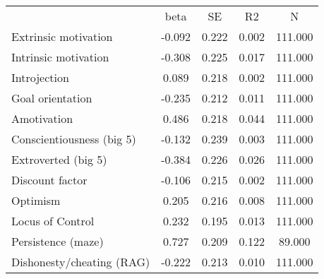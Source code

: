 {\def\sym#1{\ifmmode^{#1}\else\(^{#1}\)\fi} \begin{tabular}{l*{4}{c}} \hline\hline 
& beta & SE & R2 & N \\
Extrinsic motivation & -0.092 & 0.222 & 0.002 & 111.000 \\
Intrinsic motivation & -0.308 & 0.225 & 0.017 & 111.000 \\
Introjection & 0.089 & 0.218 & 0.002 & 111.000 \\
Goal orientation & -0.235 & 0.212 & 0.011 & 111.000 \\
Amotivation & 0.486 & 0.218 & 0.044 & 111.000 \\
Conscientiousness (big 5) & -0.132 & 0.239 & 0.003 & 111.000 \\
Extroverted (big 5) & -0.384 & 0.226 & 0.026 & 111.000 \\
Discount factor & -0.106 & 0.215 & 0.002 & 111.000 \\
Optimism & 0.205 & 0.216 & 0.008 & 111.000 \\
Locus of Control & 0.232 & 0.195 & 0.013 & 111.000 \\
Persistence (maze) & 0.727 & 0.209 & 0.122 & 89.000 \\
Dishonesty/cheating (RAG) & -0.222 & 0.213 & 0.010 & 111.000 \\
\hline\hline \end{tabular} }
